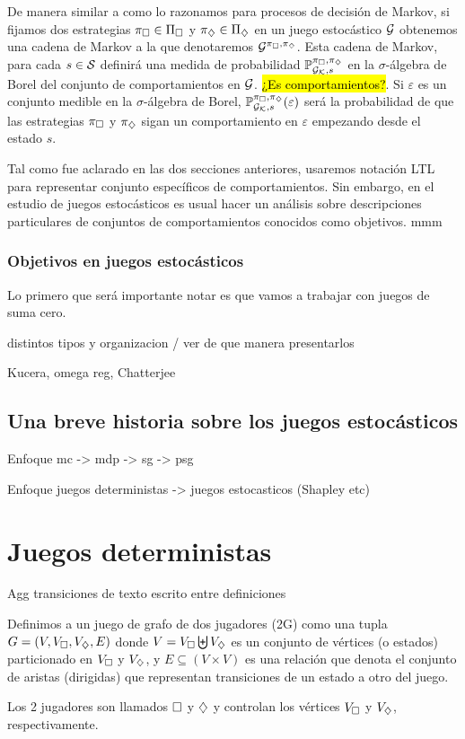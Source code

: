 De manera similar a como lo razonamos para procesos de decisión de Markov, si
fijamos dos estrategias $\pi_\square \in \Pi_\square$ y $\pi_\diamondsuit \in \Pi_\diamondsuit$
en un juego estocástico $\mathcal{G}$ obtenemos una cadena de Markov a la que
denotaremos $\mathcal{G}^{\pi_\square, \pi_\diamondsuit}$. Esta cadena de Markov, para cada $s \in
	\mathcal{S}$ definirá una medida de probabilidad $\mathbb{P}_{\mathcal{G}_{\mathcal{K}}, s}^{\pi_\square, \pi_\diamondsuit}$ en la $\sigma$-álgebra de
Borel del conjunto de comportamientos en $\mathcal{G}$. \hl{¿Es comportamientos?}. Si
$\varepsilon$ es un conjunto medible en la $\sigma$-álgebra de Borel,
$\mathbb{P}_{\mathcal{G}_{\mathcal{K}}, s}^{\pi_\square, \pi_\diamondsuit}(\varepsilon)$ será la probabilidad de que las estrategias $\pi_\square$ y
$\pi_\diamondsuit$ sigan un comportamiento en $\varepsilon$ empezando desde el estado
$s$.

Tal como fue aclarado en las dos secciones anteriores, usaremos notación LTL
para representar conjunto específicos de comportamientos. Sin embargo, en el
estudio de juegos estocásticos es usual hacer un análisis sobre descripciones
particulares de conjuntos de comportamientos conocidos como objetivos. mmm

\subsubsection{Objetivos en juegos estocásticos}

Lo primero que será importante notar es que vamos a trabajar con juegos de suma
cero.

distintos tipos y organizacion / ver de que manera presentarlos

Kucera, omega reg, Chatterjee

\subsection{Una breve historia sobre los juegos estocásticos}

Enfoque mc -> mdp -> sg -> psg

Enfoque juegos deterministas -> juegos estocasticos (Shapley etc)

\section{Juegos deterministas}

Agg transiciones de texto escrito entre definiciones

\begin{definition}
	Definimos a un juego de grafo de dos jugadores (2G) como una tupla $G = (V, V_\square,V_\diamondsuit, E)$ donde $V = V_\square \biguplus V_\diamondsuit$ es un conjunto de vértices (o estados) particionado en $V_\square$ y $V_\diamondsuit$, y $E \subseteq (V\times V)$ es una relación que denota el conjunto de aristas (dirigidas) que representan transiciones de un estado a otro del juego.

	Los 2 jugadores son llamados $\square$ y $\diamondsuit$ y controlan los vértices
	$V_\square$ y $V_\diamondsuit$, respectivamente.
\end{definition}

